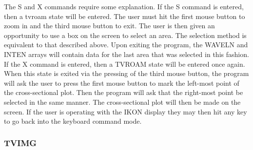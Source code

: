       The S and X commands require some explanation.  If the S command is
   entered, then a tvroam state will be entered.  The user must hit the
   first mouse button to zoom in and the third mouse button to exit.  The
   user is then given an opportunity to use a box on the screen
   to select an area.  The selection method is equivalent to that
   described above.  Upon exiting the program, the WAVELN and INTEN arrays
   will contain data for the last area that was selected in this fashion.
   If the X command is entered, then a TVROAM state will be entered once
   again.  When this state is exited via the pressing of the third mouse
   button, the program will ask the user to press the first mouse button
   to mark the left-most point of the cross-sectional plot.  Then the
   program will ask that the right-most point be selected in the same
   manner.  The cross-sectional plot will then be made on the
   screen.  If the user is operating with the IKON display they may then hit
   any key to go back into the keyboard command mode.

\subsubsection{TVIMG}


